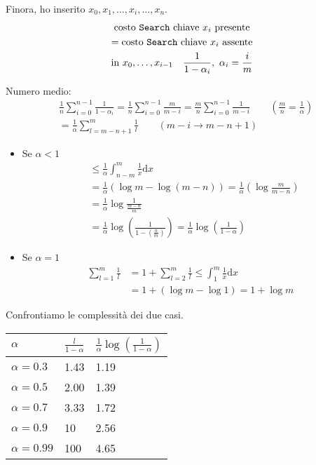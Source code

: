 Finora, ho inserito $x_0,x_1,\dots, x_i,\dots,x_n$.
\begin{gather*}
    \text{costo \texttt{Search} chiave $x_i$ presente} \\
    = \text{costo \texttt{Search} chiave $x_i$ assente} \\
    \text{in }  x_0,\dots,x_{i-1} \quad \frac{1}{1-\alpha_i}, \ \alpha_i = \frac{i}{m}
\end{gather*}

Numero medio:
\begin{align*}
    & \frac{1}{n} \displaystyle\sum_{i=0}^{n-1}\frac{1}{1-\alpha_i} 
        = \frac{1}{n} \displaystyle\sum_{i=0}^{n-1} \frac{m}{m-i} 
        = \frac{m}{n}\displaystyle\sum_{i=0}^{n-1} \frac{1}{m-i} \qquad \left(\frac{m}{n} = \frac{1}{\alpha} \right)\\
    & = \frac{1}{\alpha} \displaystyle\sum_{l=m-n+1}^{m}\frac{1}{l} \qquad (m-i \rightarrow m-n+1) 
\end{align*}

\begin{itemize}
    \item Se $\alpha < 1$ %
    \begin{align*}
        & \leq \frac{1}{\alpha} \int_{n-m}^{m}\frac{1}{x} \mathrm{d}x \\ 
        & = \frac{1}{\alpha}\left( \log m - \log (m-n) \right) = \frac{1}{\alpha}\left( \log \frac{m}{m-n} \right) \\
        & = \frac{1}{\alpha} \log \frac{1}{\frac{m-n}{m}} \\ 
        & = \frac{1}{\alpha} \log \left( \frac{1}{1-\left( \frac{n}{m} \right)} \right)
            = \frac{1}{\alpha} \log \left( \frac{1}{1-\alpha } \right)
    \end{align*}

    \item Se $\alpha = 1$
    \begin{align*}
        \displaystyle\sum_{l = 1}^{m} \frac{1}{l} & = 1 + \displaystyle\sum_{l=2}^m \frac{1}{l} 
            \leq \int_1^m \frac{1}{x} \mathrm{d}x \\
        & = 1 + \left( \log m - \log 1 \right) = 1 + \log m
    \end{align*}
\end{itemize}

Confrontiamo le complessità dei due casi.

\begin{center}
    \begin{tabular}{l|l|l}
        $\alpha$ & $\frac{l}{1-\alpha}$ & $\frac{1}{\alpha} \log \left( \frac{1}{1-\alpha} \right)$ \\
        \hline
        $\alpha = 0.3$  & 1.43 & 1.19 \\
        $\alpha = 0.5$  & 2.00 & 1.39 \\
        $\alpha = 0.7$  & 3.33 & 1.72 \\
        $\alpha = 0.9$  & 10 & 2.56 \\
        $\alpha = 0.99$ & 100 & 4.65         
    \end{tabular}
\end{center}